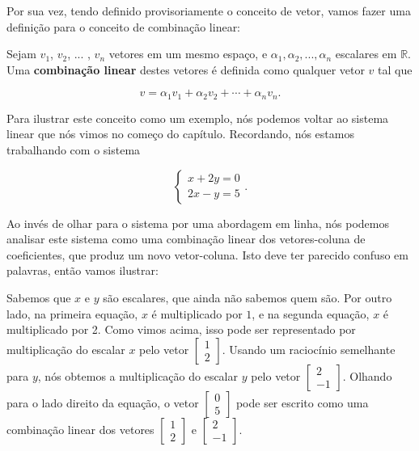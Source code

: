 Por sua vez, tendo definido provisoriamente o conceito de vetor, vamos fazer uma definição para o conceito de combinação linear:

\begin{Definition}
	Sejam $v_1$, $v_2$, ... , $v_n$ vetores em um mesmo espaço, e $\alpha_1, \alpha_2, ... , \alpha_n$ escalares em $\mathbb{R}$. Uma \textbf{combinação linear} destes vetores é definida como qualquer vetor $v$ tal que
	
	$$
	v = \alpha_1v_1 + \alpha_2v_2 + \cdots + \alpha_nv_n.
	$$
\end{Definition}

Para ilustrar este conceito como um exemplo, nós podemos voltar ao sistema linear que nós vimos no começo do capítulo. Recordando, nós estamos trabalhando com o sistema

$$
\begin{cases}
	x + 2y = 0 \\
	2x - y = 5
\end{cases}.
$$

Ao invés de olhar para o sistema por uma abordagem em linha, nós podemos analisar este sistema como uma combinação linear dos vetores-coluna de coeficientes, que produz um novo vetor-coluna. Isto deve ter parecido confuso em palavras, então vamos ilustrar:

Sabemos que $x$ e $y$ são escalares, que ainda não sabemos quem são. Por outro lado, na primeira equação, $x$ é multiplicado por $1$, e na segunda equação, $x$ é multiplicado por 2. Como vimos acima, isso pode ser representado por multiplicação do escalar $x$ pelo vetor $\begin{bmatrix} 1 \\ 2 \end{bmatrix}$. Usando um raciocínio semelhante para $y$, nós obtemos a multiplicação do escalar $y$ pelo vetor $\begin{bmatrix} 2 \\ -1 \end{bmatrix}$. Olhando para o lado direito da equação, o vetor $\begin{bmatrix} 0 \\ 5 \end{bmatrix}$ pode ser escrito como uma combinação linear dos vetores $\begin{bmatrix} 1 \\ 2 \end{bmatrix}$ e $\begin{bmatrix} 2 \\ -1 \end{bmatrix}$.

